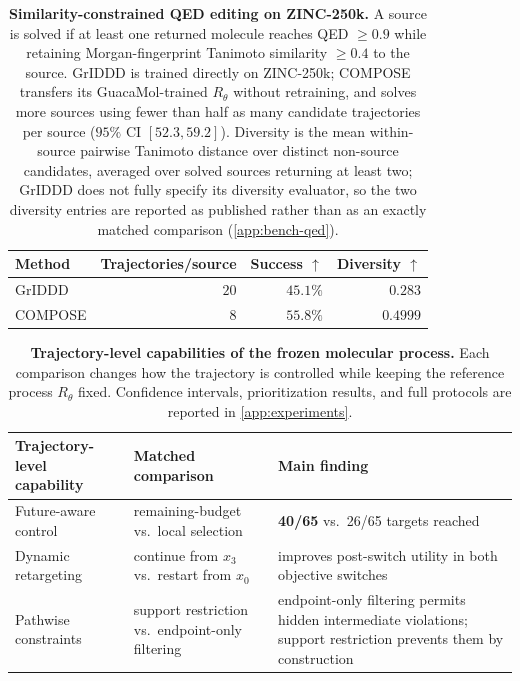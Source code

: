 \begin{table}[!ht]
\centering\small\setlength{\tabcolsep}{7pt}
\begin{tabular}{@{}lrrr@{}}
\toprule
Method & Trajectories/source & Success $\uparrow$ & Diversity $\uparrow$ \\
\midrule
GrIDDD  & $20$ & $45.1\%$          & $0.283$ \\
COMPOSE & $8$  & $\mathbf{55.8\%}$ & $\mathbf{0.4999}$ \\
\bottomrule
\end{tabular}
\caption{\small\textbf{Similarity-constrained QED editing on ZINC-250k.} A source
is solved if at least one returned molecule reaches QED $\geq0.9$ while retaining
Morgan-fingerprint Tanimoto similarity $\geq0.4$ to the source. GrIDDD is trained
directly on ZINC-250k; COMPOSE transfers its GuacaMol-trained $R_\theta$ without
retraining, and solves more sources using fewer than half as many candidate
trajectories per source ($95\%$ CI $[52.3,59.2]$). Diversity is the mean
within-source pairwise Tanimoto distance over distinct non-source candidates,
averaged over solved sources returning at least two; GrIDDD does not fully
specify its diversity evaluator, so the two diversity entries are reported as
published rather than as an exactly matched comparison (\cref{app:bench-qed}).}
\label{tab:external}
\end{table}

\begin{table}[!ht]
\centering\small\setlength{\tabcolsep}{6pt}
\begin{tabular}{@{}p{} p{} p{}@{}}
\toprule
Trajectory-level capability & Matched comparison & Main finding \\
\midrule
Future-aware control & remaining-budget vs.\ local selection
  & \textbf{40/65} vs.\ 26/65 targets reached \\
\addlinespace[2pt]
Dynamic retargeting & continue from $x_3$ vs.\ restart from $x_0$
  & improves post-switch utility in both objective switches \\
\addlinespace[2pt]
Pathwise constraints & support restriction vs.\ endpoint-only filtering
  & endpoint-only filtering permits hidden intermediate violations; support
    restriction prevents them by construction \\
\bottomrule
\end{tabular}
\caption{\small\textbf{Trajectory-level capabilities of the frozen molecular
process.} Each comparison changes how the trajectory is controlled while keeping
the reference process $R_\theta$ fixed. Confidence intervals, prioritization
results, and full protocols are reported in \cref{app:experiments}.}
\label{tab:mechanism}%
\label{fig:mechanism}
\end{table}
